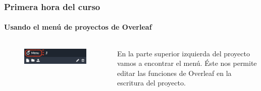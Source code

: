 \documentclass[aspectratio=169]{beamer}
\begin{document}
\begin{frame}
\frametitle{Primera hora del curso}
\framesubtitle{Usando el menú de proyectos de Overleaf}

\begin{columns}
	\begin{column}{0.48\textwidth}
		\begin{figure}
    \includegraphics[scale=0.3, left ]{imagens/Overleaf-menu.png}
    \label{fig:Creando un documento en blanco}
\end{figure}
	\end{column}
	\begin{column}{0.48\textwidth}
		En la parte superior izquierda del proyecto vamos a encontrar el menú. Éste nos permite editar las funciones de Overleaf en la escritura del proyecto.
	\end{column}
\end{columns}

\end{frame}
\end{document}

